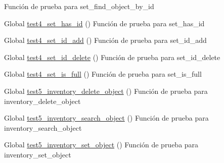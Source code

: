 \begin{DoxyRefList}
Función de prueba para set\+\_\+find\+\_\+object\+\_\+by\+\_\+id  
\item[Global \mbox{\hyperlink{set__test_8c_a6a71db05b8235664b1e58668269f2a1f}{test4\+\_\+set\+\_\+has\+\_\+id}} ()]\label{test__test000227}%
%
Función de prueba para set\+\_\+has\+\_\+id  
\item[Global \mbox{\hyperlink{set__test_8c_a9bdb9407c9e526d4175d443b0129f42c}{test4\+\_\+set\+\_\+id\+\_\+add}} ()]\label{test__test000214}%
%
Función de prueba para set\+\_\+id\+\_\+add  
\item[Global \mbox{\hyperlink{set__test_8c_ac548868fd332f344efa73476cecaeed7}{test4\+\_\+set\+\_\+id\+\_\+delete}} ()]\label{test__test000218}%
%
Función de prueba para set\+\_\+id\+\_\+delete  
\item[Global \mbox{\hyperlink{set__test_8c_a7c9b7ee9e08542c3d69a85d7620f632f}{test4\+\_\+set\+\_\+is\+\_\+full}} ()]\label{test__test000238}%
%
Función de prueba para set\+\_\+is\+\_\+full  
\item[Global \mbox{\hyperlink{inventory__test_8c_a1646b8bd9957d8175d8af6b4f7607b73}{test5\+\_\+inventory\+\_\+delete\+\_\+object}} ()]\label{test__test000084}%
%
Función de prueba para inventory\+\_\+delete\+\_\+object  
\item[Global \mbox{\hyperlink{inventory__test_8c_a0c776d6245202f4d3fef6816fb54cf2d}{test5\+\_\+inventory\+\_\+search\+\_\+object}} ()]\label{test__test000095}%
%
Función de prueba para inventory\+\_\+search\+\_\+object  
\item[Global \mbox{\hyperlink{inventory__test_8c_af3214c45d3ebaefe862514acb977a418}{test5\+\_\+inventory\+\_\+set\+\_\+object}} ()]\label{test__test000072}%
%
Función de prueba para inventory\+\_\+set\+\_\+object 
\end{DoxyRefList}